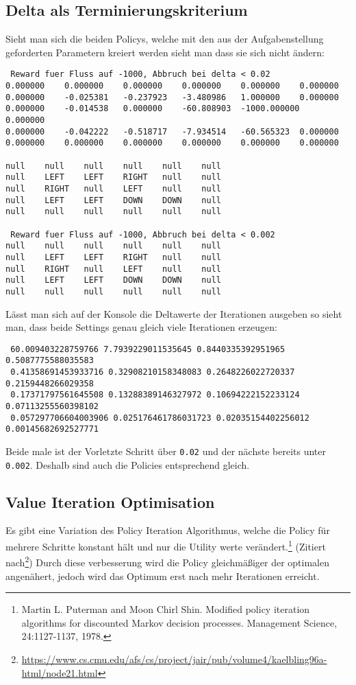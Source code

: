 \documentclass[a4paper]{article}
\begin{document}
\subsection{Delta als Terminierungskriterium}
Sieht man sich die beiden Policys, welche mit den aus der Aufgabenstellung geforderten Parametern kreiert werden sieht man dass sie sich nicht ändern:
\begin{lstlisting}
 Reward fuer Fluss auf -1000, Abbruch bei delta < 0.02
0.000000 	0.000000 	0.000000 	0.000000 	0.000000 	0.000000 	
0.000000 	-0.025381 	-0.237923 	-3.480986 	1.000000 	0.000000 	
0.000000 	-0.014538 	0.000000 	-60.808903 	-1000.000000 	0.000000 	
0.000000 	-0.042222 	-0.518717 	-7.934514 	-60.565323 	0.000000 	
0.000000 	0.000000 	0.000000 	0.000000 	0.000000 	0.000000 	

null	null	null	null	null	null	
null	LEFT	LEFT	RIGHT	null	null	
null	RIGHT	null	LEFT	null	null	
null	LEFT	LEFT	DOWN	DOWN	null	
null	null	null	null	null	null	

 Reward fuer Fluss auf -1000, Abbruch bei delta < 0.002
null	null	null	null	null	null	
null	LEFT	LEFT	RIGHT	null	null	
null	RIGHT	null	LEFT	null	null	
null	LEFT	LEFT	DOWN	DOWN	null	
null	null	null	null	null	null	

\end{lstlisting}
Lässt man sich auf der Konsole die Deltawerte der Iterationen ausgeben so sieht man, dass beide Settings genau gleich viele Iterationen erzeugen:
\begin{lstlisting}
 60.009403228759766 7.7939229011535645 0.8440335392951965 0.5087775588035583
 0.41358691453933716 0.32908210158348083 0.2648226022720337 0.2159448266029358
 0.17371797561645508 0.13288389146327972 0.10694222152233124 0.07113255560398102
 0.057297706604003906 0.025176461786031723 0.02035154402256012 0.00145682692527771
\end{lstlisting}

Beide male ist der Vorletzte Schritt über \texttt{0.02} und der nächste bereits unter \texttt{0.002}. Deshalb sind auch die Policies entsprechend gleich.
\lstset{numbers=left}

\subsection*{Value Iteration Optimisation}
Es gibt eine Variation des Policy Iteration Algorithmus, welche die Policy für mehrere Schritte konstant hält und nur die Utility werte verändert.\footnote{
Martin L. Puterman and Moon Chirl Shin. Modified policy iteration algorithms for discounted Markov decision processes. Management Science, 24:1127-1137, 1978.}
(Zitiert nach\footnote{\url{https://www.cs.cmu.edu/afs/cs/project/jair/pub/volume4/kaelbling96a-html/node21.html}}) Durch diese verbesserung wird die Policy gleichmäßiger der optimalen angenähert, jedoch wird das Optimum erst nach mehr Iterationen erreicht.\\
\end{document}
